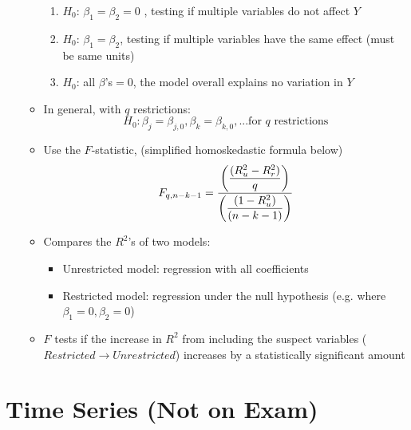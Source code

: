 \documentclass{article}
\begin{document}
\begin{itemize}
\begin{itemize}
\begin{enumerate}
			\item $H_0$: $\beta_1=\beta_2=0$	, testing if multiple variables do not affect $Y$
			\item $H_0$: $\beta_1=\beta_2$, testing if multiple variables have the same effect (must be same units)
			\item $H_0$: all $\beta$'s$=0$, the model overall explains no variation in $Y$
		\end{enumerate}
		\item In general, with $q$ restrictions:
		\begin{equation*}
		H_0: \beta_j=\beta_{j,0}, \beta_k=\beta_{k,0}, ...\text{for }q \text{ restrictions}	
		\end{equation*}
		\item Use the $F$-statistic, (simplified homoskedastic formula below)
		\begin{equation*}
	F_{q,n-k-1}=\cfrac{\bigg(\displaystyle\frac{(R^2_u-R^2_r)}{q}\bigg)}{\bigg(\displaystyle\frac{(1-R^2_u)}{(n-k-1)}\bigg)}
	\end{equation*}
		\item Compares the $R^2$'s of two models:
		\begin{itemize}
			\item Unrestricted model: regression with all coefficients
			\item Restricted model: regression under the null hypothesis (e.g. where $\beta_1=0, \beta_2=0$)
	\end{itemize}
	\item $F$ tests if the increase in $R^2$ from including the suspect variables ($Restricted \rightarrow Unrestricted$) increases by a statistically significant amount
\end{itemize}
\end{itemize}
\clearpage 

\section*{Time Series (Not on Exam)}
\end{document}
